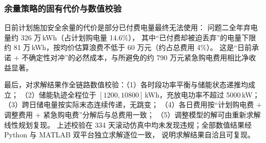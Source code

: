 \subsubsection{余量策略的固有代价与数值校验}
日前计划施加安全余量的代价是部分已付费电量最终无法使用：
问题二全年弃电量约 326 万\,kWh（占计划购电量 14.6\%），
其中“已付费却被迫丢弃”的电量下限约 81 万\,kWh，按均价估算浪费不低于 60 万元（约占总费用 4\%）。
这是“日前承诺 $+$ 不确定性对冲”的必然成本，与所避免的约 790 万元紧急购电费用相比净收益显著。

最后，对求解结果作全链路数值校验：（1）各时段功率平衡与储能状态递推均成立；
（2）储能轨迹全程位于 $[1200,10800]$\,kWh，充放电功率不超过 5000\,kW；
（3）跨日储电量按实际末态连续传递，无跳变；
（4）各日费用按“计划购电费 $+$ 调整费用 $+$ 紧急购电费”分解后与总费用一致；
（5）调整模型的解可由重新求解线性规划复现。
上述校验在 334 天滚动仿真中均未发现违规；全部数值结果经 Python 与 MATLAB 双平台独立求解逐位一致，
说明求解结果自洽且可复现。
